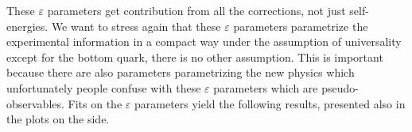 \documentclass[../main.tex]{subfiles}
\begin{document}
These $\varepsilon$ parameters get contribution from all the corrections, not just self-energies. We want to stress again that these $\varepsilon$ parameters parametrize the experimental information in a compact way under the assumption of universality except for the bottom quark, there is no other assumption. This is important because there are also parameters parametrizing the new physics which unfortunately people confuse with these $\varepsilon$ parameters which are pseudo-observables. Fits on the $\varepsilon$ parameters yield the following results, presented also in the plots on the side.
\end{document}
